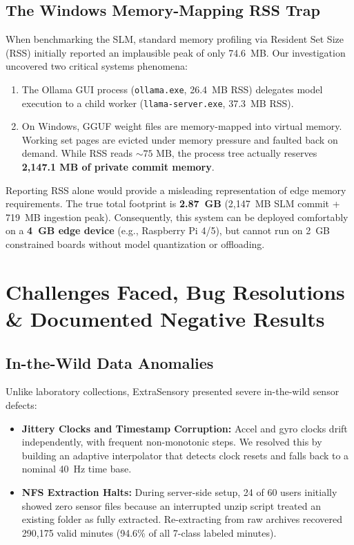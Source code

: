 \documentclass[11pt,a4paper]{article}
\begin{document}
\subsection{The Windows Memory-Mapping RSS Trap}
When benchmarking the SLM, standard memory profiling via Resident Set Size (RSS) initially reported an implausible peak of only 74.6~MB. Our investigation uncovered two critical systems phenomena:
\begin{enumerate}[leftmargin=1.5em,noitemsep,topsep=2pt]
  \item The Ollama GUI process (\texttt{ollama.exe}, 26.4~MB RSS) delegates model execution to a child worker (\texttt{llama-server.exe}, 37.3~MB RSS).
  \item On Windows, GGUF weight files are memory-mapped into virtual memory. Working set pages are evicted under memory pressure and faulted back on demand. While RSS reads $\sim 75\text{ MB}$, the process tree actually reserves \textbf{2,147.1 MB of private commit memory}.
\end{enumerate}
Reporting RSS alone would provide a misleading representation of edge memory requirements. The true total footprint is \textbf{2.87~GB} (2,147~MB SLM commit + 719~MB ingestion peak). Consequently, this system can be deployed comfortably on a \textbf{4~GB edge device} (e.g., Raspberry Pi 4/5), but cannot run on 2~GB constrained boards without model quantization or offloading.

\section{Challenges Faced, Bug Resolutions \& Documented Negative Results}
\label{sec:challenges}

\subsection{In-the-Wild Data Anomalies}
Unlike laboratory collections, ExtraSensory presented severe in-the-wild sensor defects:
\begin{itemize}[leftmargin=1.5em,noitemsep,topsep=2pt]
  \item \textbf{Jittery Clocks and Timestamp Corruption:} Accel and gyro clocks drift independently, with frequent non-monotonic steps. We resolved this by building an adaptive interpolator that detects clock resets and falls back to a nominal 40~Hz time base.
  \item \textbf{NFS Extraction Halts:} During server-side setup, 24 of 60 users initially showed zero sensor files because an interrupted unzip script treated an existing folder as fully extracted. Re-extracting from raw archives recovered 290,175 valid minutes (94.6\% of all 7-class labeled minutes).
\end{itemize}
\end{document}

